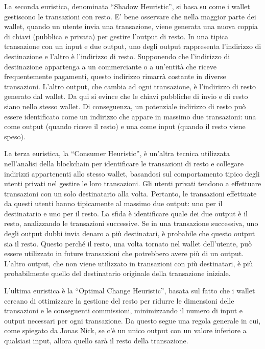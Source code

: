 La seconda euristica, denominata “Shadow Heuristic”, si basa su come i wallet gestiscono le transazioni con resto. E' bene osservare che nella maggior parte dei wallet, quando un utente invia una transazione, viene generata una nuova coppia di chiavi (pubblica e privata) per gestire l'output di resto. In una tipica transazione con un input e due output, uno degli output rappresenta l'indirizzo di destinazione e l'altro è l'indirizzo di resto. Supponendo che l'indirizzo di destinazione appartenga a un commerciante o a un'entità che riceve frequentemente pagamenti, questo indirizzo rimarrà costante in diverse transazioni. L'altro output, che cambia ad ogni transazione, è l'indirizzo di resto generato dal wallet. Da qui si evince che le chiavi pubbliche di invio e di resto siano nello stesso wallet. Di conseguenza, un potenziale indirizzo di resto può essere identificato come un indirizzo che appare in massimo due transazioni: una come output (quando riceve il resto) e una come input (quando il resto viene speso).

La terza euristica, la “Consumer Heuristic”, è un'altra tecnica utilizzata nell'analisi della blockchain per identificare le transazioni di resto e collegare indirizzi appartenenti allo stesso wallet, basandosi sul comportamento tipico degli utenti privati nel gestire le loro transazioni. Gli utenti privati tendono a effettuare transazioni con un solo destinatario alla volta. Pertanto, le transazioni effettuate da questi utenti hanno tipicamente al massimo due output: uno per il destinatario e uno per il resto. La sfida è identificare quale dei due output è il resto, analizzando le transazioni successive. Se in una transazione successiva, uno degli output dubbi invia denaro a più destinatari, è probabile che questo output sia il resto. Questo perché il resto, una volta tornato nel wallet dell'utente, può essere utilizzato in future transazioni che potrebbero avere più di un output. L'altro output, che non viene utilizzato in transazioni con più destinatari, è più probabilmente quello del destinatario originale della transazione iniziale.

L'ultima euristica è la “Optimal Change Heuristic”, basata sul fatto che i wallet cercano di ottimizzare la gestione del resto per ridurre le dimensioni delle transazioni e le conseguenti commissioni, minimizzando il numero di input e output necessari per ogni transazione. Da questo segue una regola generale in cui, come spiegato da Jonas Nick, se c'è un unico output con un valore inferiore a qualsiasi input, allora quello sarà il resto della transazione.

